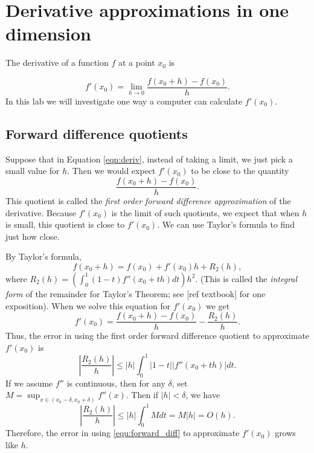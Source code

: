 \label{Ch:Numerical Derivatives}


\section*{Derivative approximations in one dimension}
The derivative of a function $f$ at a point $x_0$ is

\begin{equation}
\label{eqn:deriv}
f'(x_0) = \lim_{h\rightarrow 0} \frac{f(x_0 + h)-f(x_0)}{h}.
\end{equation}
In this lab we will investigate one way a computer can calculate $f'(x_0)$. 

\subsection*{Forward difference quotients}
Suppose that in Equation \ref{eqn:deriv}, instead of taking a limit, we just pick a small value for $h$. 
Then we would expect $f'(x_0)$ to be close to the quantity
\begin{equation}\label{equ:forward_diff}
 \frac{f(x_0 + h)-f(x_0)}{h}.
\end{equation}
This quotient is called the \emph{first order forward difference approximation} of the derivative. 
Because $f'(x_0)$ is the limit of such quotients, we expect that when $h$ is small, this quotient is close to $f'(x_0)$. 
We can use Taylor's formula to find just how close.

By Taylor's formula,
\[
f(x_0+h) = f(x_0) + f'(x_0)h + R_2(h),
\]
where $R_2(h) = \left( \int_0^1 (1-t) f''(x_0+th) dt \right) h^2$. 
(This is called the \emph{integral form} of the remainder for Taylor's Theorem; see [ref textbook] for one exposition). When we solve this equation for $f'(x_0)$ we get
\begin{equation}\label{equ:forward_diff_with_remainder}
f'(x_0) = \frac{f(x_0+h)-f(x_0)}{h} - \frac{R_2(h)}{h}.
\end{equation}
Thus, the error in using the first order forward difference quotient to approximate $f'(x_0)$ is 
\[
\left | \frac{R_2(h)}{h} \right | \leq |h| \int_0^1 |1 - t||f''(x_0+th)|dt.
\]
If we assume $f''$ is continuous, then for any $\delta$, set $M = \sup_{x \in (x_0-\delta, x_0+\delta)} f''(x)$. Then if $|h| < \delta$, we have
\[
\left | \frac{R_2(h)}{h} \right | \leq |h|\int_0^1 M dt = M|h| = O(h).
\]
Therefore, the error in using \eqref{equ:forward_diff} to approximate $f'(x_0)$ grows like $h$.



